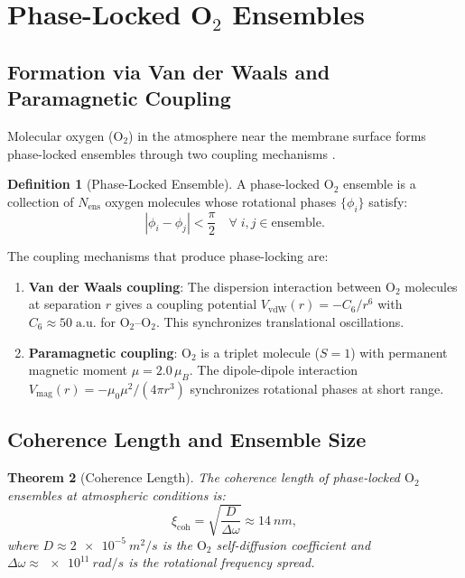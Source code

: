 \documentclass[twocolumn,10pt]{article}
\newtheorem{theorem}{Theorem}[section]
\theoremstyle{definition}
\newtheorem{definition}[theorem]{Definition}
\theoremstyle{remark}
\newcommand{\xicoh}{\xi_{\mathrm{coh}}}
\newcommand{\Nens}{N_{\mathrm{ens}}}
\begin{document}
\section{Phase-Locked O$_2$ Ensembles}
\label{sec:phase_locked}

\subsection{Formation via Van der Waals and Paramagnetic Coupling}

Molecular oxygen ($\mathrm{O}_2$) in the atmosphere near the membrane surface forms phase-locked ensembles through two coupling mechanisms \cite{sachikonye2026gas, sachikonye2026atmospheric}.

\begin{definition}[Phase-Locked Ensemble]
\label{def:phase_locked}
A phase-locked $\mathrm{O}_2$ ensemble is a collection of $\Nens$ oxygen molecules whose rotational phases $\{\phi_i\}$ satisfy:
\begin{equation}
  |\phi_i - \phi_j| < \frac{\pi}{2} \quad \forall\; i, j \in \mathrm{ensemble}.
  \label{eq:phase_lock}
\end{equation}
\end{definition}

The coupling mechanisms that produce phase-locking are:

\begin{enumerate}[label=(\roman*)]
  \item \textbf{Van der Waals coupling}: The dispersion interaction between $\mathrm{O}_2$ molecules at separation $r$ gives a coupling potential $V_{\mathrm{vdW}}(r) = -C_6/r^6$ with $C_6 \approx 50\;\mathrm{a.u.}$ for $\mathrm{O}_2$--$\mathrm{O}_2$. This synchronizes translational oscillations.

  \item \textbf{Paramagnetic coupling}: $\mathrm{O}_2$ is a triplet molecule ($S = 1$) with permanent magnetic moment $\mu = 2.0\,\mu_B$. The dipole-dipole interaction $V_{\mathrm{mag}}(r) = -\mu_0 \mu^2/(4\pi r^3)$ synchronizes rotational phases at short range.
\end{enumerate}

\subsection{Coherence Length and Ensemble Size}

\begin{theorem}[Coherence Length]
\label{thm:coherence}
The coherence length of phase-locked $\mathrm{O}_2$ ensembles at atmospheric conditions is:
\begin{equation}
  \xicoh = \sqrt{\frac{D}{\Delta\omega}} \approx \SI{14}{nm},
  \label{eq:coherence_length}
\end{equation}
where $D \approx \SI{2e-5}{m^2/s}$ is the $\mathrm{O}_2$ self-diffusion coefficient and $\Delta\omega \approx \SI{e11}{rad/s}$ is the rotational frequency spread.
\end{theorem}
\end{document}
